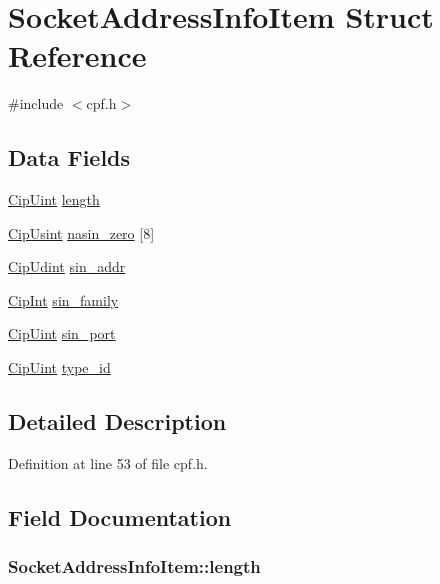 \hypertarget{structSocketAddressInfoItem}{\section{\-Socket\-Address\-Info\-Item \-Struct \-Reference}
\label{dc/d3c/structSocketAddressInfoItem}
}


{\ttfamily \#include $<$cpf.\-h$>$}

\subsection*{\-Data \-Fields}
\begin{DoxyCompactItemize}
\item 
\hyperlink{typedefs_8h_a72c0fba927c5681c44dbf59147578fc7}{\-Cip\-Uint} \hyperlink{structSocketAddressInfoItem_a8933e644c7191ea8f5a22401b2e6a6fa}{length}
\item 
\hyperlink{typedefs_8h_a378b726bef4c65cb2ec1c1cdf1205f52}{\-Cip\-Usint} \hyperlink{structSocketAddressInfoItem_abaf556494b9fea3137c6c45522ab9bda}{nasin\-\_\-zero} \mbox{[}8\mbox{]}
\item 
\hyperlink{typedefs_8h_aa6230aff6a173bcb6dc949ac85c2e7f1}{\-Cip\-Udint} \hyperlink{structSocketAddressInfoItem_a46921af5bef9ee04546194f8d19d3163}{sin\-\_\-addr}
\item 
\hyperlink{typedefs_8h_a1be1b4a809b73131a8674fcf96d17968}{\-Cip\-Int} \hyperlink{structSocketAddressInfoItem_a6698e4b44eeaf0795025d0be524b8e8a}{sin\-\_\-family}
\item 
\hyperlink{typedefs_8h_a72c0fba927c5681c44dbf59147578fc7}{\-Cip\-Uint} \hyperlink{structSocketAddressInfoItem_a3f7a4600643a87742112758468b42146}{sin\-\_\-port}
\item 
\hyperlink{typedefs_8h_a72c0fba927c5681c44dbf59147578fc7}{\-Cip\-Uint} \hyperlink{structSocketAddressInfoItem_ad71289b55ab0ff6a4382af44afaccca2}{type\-\_\-id}
\end{DoxyCompactItemize}


\subsection{\-Detailed \-Description}


\-Definition at line 53 of file cpf.\-h.



\subsection{\-Field \-Documentation}
\hypertarget{structSocketAddressInfoItem_a8933e644c7191ea8f5a22401b2e6a6fa}{
\subsubsection[{length}]{ {\bf \-Socket\-Address\-Info\-Item\-::length}}}\label{dc/d3c/structSocketAddressInfoItem_a8933e644c7191ea8f5a22401b2e6a6fa}


